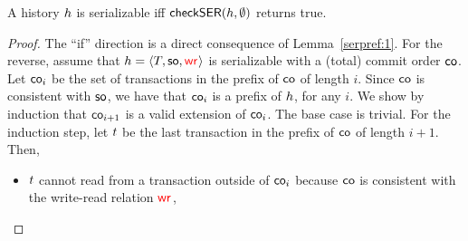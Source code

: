 \begin{theorem}
 A history ${h}$ is serializable iff $\mathsf{checkSER}({h},\emptyset)$ returns true.
\end{theorem}
\begin{proof}
The ``if'' direction is a direct consequence of Lemma~\ref{serpref:1}. 
%
For the reverse, assume that ${h}={\left\langle{T,\mathsf{so},\textcolor{red}{\mathsf{wr}_{}}}\right\rangle}$ is serializable with a (total) commit order $\mathsf{co}$. Let $\mathsf{co}_i$ be the set of transactions in the prefix of $\mathsf{co}$ of length $i$. 
Since $\mathsf{co}$ is consistent with $\mathsf{so}$, we have that $\mathsf{co}_i$ is a prefix of ${h}$, for any $i$.
We show by induction that $\mathsf{co}_{i+1}$ is a valid extension of $\mathsf{co}_i$. The base case is trivial. For the induction step, let ${t}$ be the last transaction in the prefix of $\mathsf{co}$ of length $i+1$. Then,
%
%
\begin{itemize}
%
%
\item ${t}$ cannot read from a transaction outside of $\mathsf{co}_i$ because $\mathsf{co}$ is consistent with the write-read relation $\textcolor{red}{\mathsf{wr}_{}}$, 

\end{itemize}
\end{proof}
